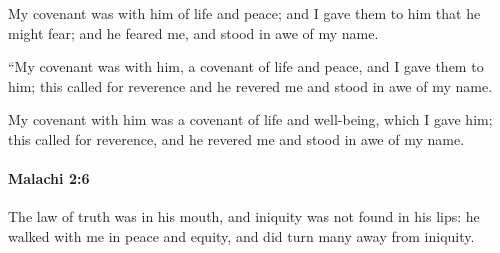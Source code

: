 			\begin{versebox}
					\item[BHS] 
					\item[LXX] 
					\item[ASV] My covenant was with him of life and peace; and I gave them to him that he might fear; and he feared me, and stood in awe of my name.
					\item[NIV] “My covenant was with him, a covenant of life and peace, and I gave them to him; this called for reverence and he revered me and stood in awe of my name.
					\item[NRSV] My covenant with him was a covenant of life and well-being, which I gave him; this called for reverence, and he revered me and stood in awe of my name.
			\end{versebox}

		\paragraph{Malachi 2:6} %
			\label{MALACHI-2-6}

			The law of truth was in his mouth, and iniquity was not found in his lips: he walked with me in peace and equity, and did turn many away from iniquity.


